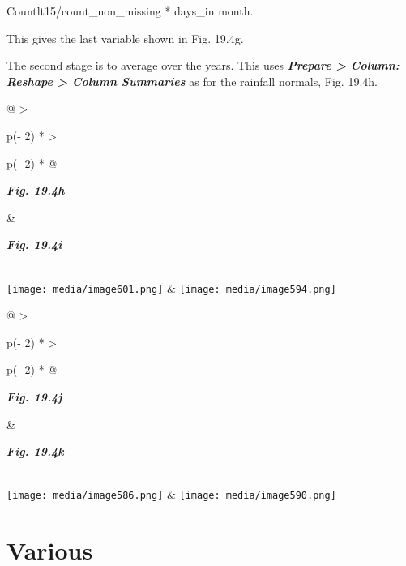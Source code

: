 \documentclass[
  letterpaper,
  DIV=11,
  numbers=noendperiod]{scrreprt}
\begin{document}
Countlt15/count\_non\_missing * days\_in month.

This gives the last variable shown in Fig. 19.4g.

The second stage is to average over the years. This uses
\textbf{\emph{Prepare \textgreater{} Column: Reshape \textgreater{}
Column Summaries}} as for the rainfall normals, Fig. 19.4h.

\begin{longtable}[]{@{}
  >{\raggedright\arraybackslash}p{(\columnwidth - 2\tabcolsep) * }
  >{\raggedright\arraybackslash}p{(\columnwidth - 2\tabcolsep) * }@{}}
\toprule\noalign{}
\begin{minipage}[b]{\linewidth}\raggedright
\textbf{\emph{Fig. 19.4h}}
\end{minipage} & \begin{minipage}[b]{\linewidth}\raggedright
\textbf{\emph{Fig. 19.4i}}
\end{minipage} \\
\midrule\noalign{}
\endhead
\bottomrule\noalign{}
\endlastfoot
\texttt{[image: media/image601.png]} &
\texttt{[image: media/image594.png]} \\
\end{longtable}

\begin{longtable}[]{@{}
  >{\raggedright\arraybackslash}p{(\columnwidth - 2\tabcolsep) * }
  >{\raggedright\arraybackslash}p{(\columnwidth - 2\tabcolsep) * }@{}}
\toprule\noalign{}
\begin{minipage}[b]{\linewidth}\raggedright
\textbf{\emph{Fig. 19.4j}}
\end{minipage} & \begin{minipage}[b]{\linewidth}\raggedright
\textbf{\emph{Fig. 19.4k}}
\end{minipage} \\
\midrule\noalign{}
\endhead
\bottomrule\noalign{}
\endlastfoot
\texttt{[image: media/image586.png]} &
\texttt{[image: media/image590.png]} \\
\end{longtable}


\chapter{Various}\label{various}
\end{document}
